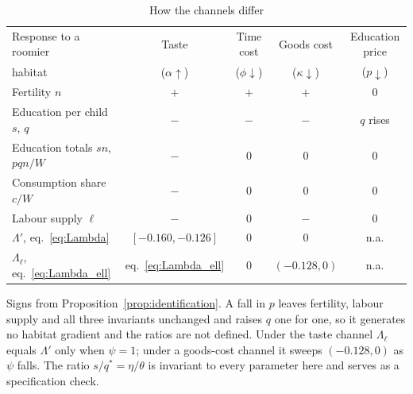 \documentclass[11pt]{article}
\begin{document}
\begin{table}[h!]\centering
\begin{threeparttable}
\caption{How the channels differ}
\label{tab:fingerprints}
\begin{tabular}{lcccc}
\toprule
Response to a roomier & Taste & Time cost & Goods cost & Education price\\
habitat & ($\alpha\uparrow$) & ($\phi\downarrow$) & ($\kappa\downarrow$) & ($p\downarrow$)\\
\midrule
Fertility $n$                            & $+$ & $+$ & $+$ & $0$\\
Education per child $s$, $q$             & $-$ & $-$ & $-$ & $q$ rises\\
Education totals $sn$, $pqn/W$           & $-$ & $0$ & $0$ & $0$\\
Consumption share $c/W$                  & $-$ & $0$ & $0$ & $0$\\
Labour supply $\ell$                     & $-$ & $0$ & $-$ & $0$\\
\midrule
$\Lambda'$, eq.~\eqref{eq:Lambda}        & $[-0.160,-0.126]$ & $0$ & $0$ & n.a.\\
$\Lambda_\ell$, eq.~\eqref{eq:Lambda_ell}& eq.~\eqref{eq:Lambda_ell} & $0$ & $(-0.128,0)$ & n.a.\\
\bottomrule
\end{tabular}
\begin{tablenotes}\footnotesize
\item Signs from Proposition~\ref{prop:identification}. A fall in $p$ leaves fertility, labour
supply and all three invariants unchanged and raises $q$ one for one, so it generates no habitat
gradient and the ratios are not defined. Under the taste channel $\Lambda_\ell$ equals $\Lambda'$
only when $\psi=1$; under a goods-cost channel it sweeps $(-0.128,0)$ as $\psi$ falls. The ratio
$s/q^{\ast}=\eta/\theta$ is invariant to every parameter here and serves as a specification check.
\end{tablenotes}
\end{threeparttable}
\end{table}
\end{document}
